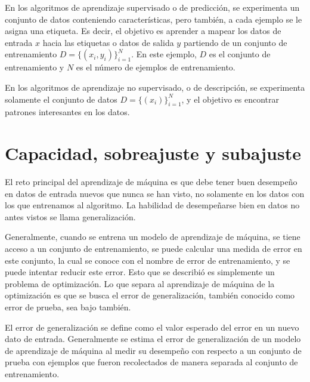 \vspace{1em}

En los algoritmos de aprendizaje supervisado o de predicción, se experimenta un conjunto de datos conteniendo características, pero también, a cada ejemplo se le asigna una etiqueta. Es decir, el objetivo es aprender a mapear los datos de entrada $x$ hacia las etiquetas o datos de salida $y$ partiendo de un conjunto de entrenamiento $D = \{(x_i, y_i)\}_{i=1}^N$. En este ejemplo, $D$ es el conjunto de entrenamiento y $N$ es el número de ejemplos de entrenamiento. \cite{Murphy:2012:MLP:2380985}

\vspace{1em}

En los algoritmos de aprendizaje no supervisado, o de descripción, se experimenta solamente el conjunto de datos $D = \{(x_i)\}_{i=1}^N$, y el objetivo es encontrar patrones interesantes en los datos. \cite{Murphy:2012:MLP:2380985}

\section{Capacidad, sobreajuste y subajuste}
El reto principal del aprendizaje de máquina es que debe tener buen desempeño en datos de entrada nuevos que nunca se han visto, no solamente en los datos con los que entrenamos al algoritmo. La habilidad de desempeñarse bien en datos no antes vistos se llama generalización.


\vspace{1em}

Generalmente, cuando se entrena un modelo de aprendizaje de máquina, se tiene acceso a un conjunto de entrenamiento, se puede calcular una medida de error en este conjunto, la cual se conoce con el nombre de error de entrenamiento, y se puede intentar reducir este error. Esto que se describió es simplemente un problema de optimización. Lo que separa al aprendizaje de máquina de la optimización es que se busca el error de generalización, también conocido como error de prueba, sea bajo también. \cite{goodfellow-et-al-2016}

\vspace{1em}

El error de generalización se define como el valor esperado del error en un nuevo dato de entrada. Generalmente se estima el error de generalización de un modelo de aprendizaje de máquina al medir su desempeño con respecto a un conjunto de prueba con ejemplos que fueron recolectados de manera separada al conjunto de entrenamiento. 

